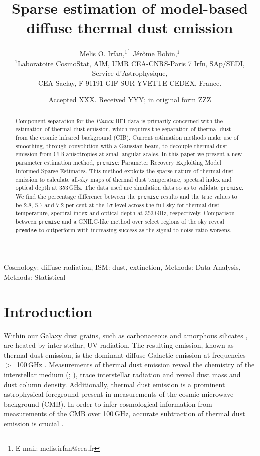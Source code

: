 \documentclass[a4paper,fleqn,usenatbib]{mnras}
\title[Sparse parameter estimation]{Sparse estimation of model-based diffuse thermal dust emission}
\author[M. O. Irfan et al.]{
Melis O. Irfan,$^{1}$\thanks{E-mail: melis.irfan@cea.fr}
J\'er\^ome Bobin,$^{1}$
\\
$^{1}$Laboratoire CosmoStat, AIM, UMR CEA-CNRS-Paris 7 Irfu, SAp/SEDI, Service d'Astrophysique, \\ CEA Saclay, F-91191 GIF-SUR-YVETTE CEDEX, France.\\
}
\date{Accepted XXX. Received YYY; in original form ZZZ}
\begin{document}
\label{firstpage}
\pagerange{\pageref{firstpage}--\pageref{lastpage}}
\maketitle

\begin{abstract}
Component separation for the {\it{Planck}} HFI data is primarily concerned with the estimation of thermal dust emission, which requires the separation of thermal dust from the cosmic infrared background (CIB). Current estimation methods make use of smoothing, through convolution with a Gaussian beam, to decouple thermal dust emission from CIB anisotropies at small angular scales. In this paper we present a new parameter estimation method, {\texttt{premise}}: Parameter Recovery Exploiting Model Informed Sparse Estimates. This method exploits the sparse nature of thermal dust emission to calculate all-sky maps of thermal dust temperature, spectral index and optical depth at 353\,GHz. The data used are simulation data so as to validate {\texttt{premise}}. We find the percentage difference between the {\texttt{premise}} results and the true values to be 2.8, 5.7 and 7.2 per cent at the 1$\sigma$ level across the full sky for thermal dust temperature, spectral index and optical depth at 353\,GHz, respectively. Comparison between {\texttt{premise}} and a GNILC-like method over select regions of the sky reveal {\texttt{premise}} to outperform with increasing success as the signal-to-noise ratio worsens.  
\end{abstract}

\begin{keywords}
Cosmology: diffuse radiation, ISM: dust, extinction, Methods: Data Analysis, Methods: Statistical
\end{keywords}



\section{Introduction}

Within our Galaxy dust grains, such as carbonaceous and amorphous silicates \citep{draine}, are heated by inter-stellar, UV radiation. The resulting emission, known as thermal dust emission, is the dominant diffuse Galactic emission at frequencies{\mbox{ $>$ 100\,GHz}} \citep{bennett}. Measurements of thermal dust emission reveal the chemistry of the interstellar medium (\citet{comp11}; \cite{jones}), trace interstellar radiation and reveal dust mass and dust column density. Additionally, thermal dust emission is a prominent astrophysical foreground present in measurements of the cosmic microwave background (CMB). In order to infer cosmological information from measurements of the CMB over 100\,GHz, accurate subtraction of thermal dust emission is crucial \citep{planckCompSep}.
\end{document}

